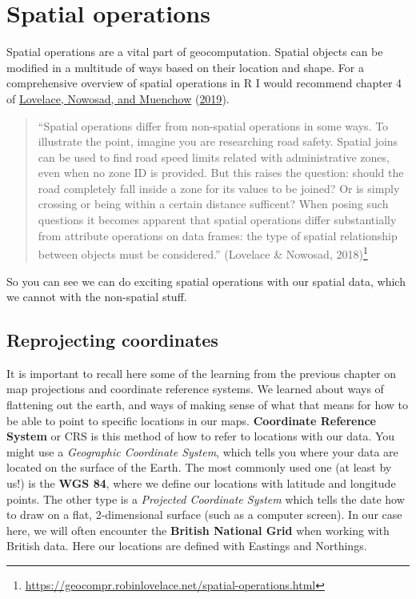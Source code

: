 \documentclass[
]{book}
\renewcommand{\href}[2]{#2\footnote{\url{#1}}}
\begin{document}
\hypertarget{spatial-operations}{%
\section{Spatial operations}\label{spatial-operations}}

Spatial operations are a vital part of geocomputation. Spatial objects can be modified in a multitude of ways based on their location and shape. For a comprehensive overview of spatial operations in R I would recommend chapter 4 of \protect\hyperlink{ref-Lovelace_2019}{Lovelace, Nowosad, and Muenchow} (\protect\hyperlink{ref-Lovelace_2019}{2019}).

\begin{quote}
``Spatial operations differ from non-spatial operations in some ways. To illustrate the point, imagine you are researching road safety. Spatial joins can be used to find road speed limits related with administrative zones, even when no zone ID is provided. But this raises the question: should the road completely fall inside a zone for its values to be joined? Or is simply crossing or being within a certain distance sufficent? When posing such questions it becomes apparent that spatial operations differ substantially from attribute operations on data frames: the type of spatial relationship between objects must be considered.'' \href{https://geocompr.robinlovelace.net/spatial-operations.html}{(Lovelace \& Nowosad, 2018)}
\end{quote}

So you can see we can do exciting spatial operations with our spatial data, which we cannot with the non-spatial stuff.

\hypertarget{reprojecting-coordinates}{%
\subsection{Reprojecting coordinates}\label{reprojecting-coordinates}}

It is important to recall here some of the learning from the previous chapter on map projections and coordinate reference systems. We learned about ways of flattening out the earth, and ways of making sense of what that means for how to be able to point to specific locations in our maps. \textbf{Coordinate Reference System} or CRS is this method of how to refer to locations with our data. You might use a \emph{Geographic Coordinate System}, which tells you where your data are located on the surface of the Earth. The most commonly used one (at least by us!) is the \textbf{WGS 84}, where we define our locations with latitude and longitude points. The other type is a \emph{Projected Coordinate System} which tells the date how to draw on a flat, 2-dimensional surface (such as a computer screen). In our case here, we will often encounter the \textbf{British National Grid} when working with British data. Here our locations are defined with Eastings and Northings.
\end{document}
